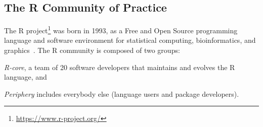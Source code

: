 



\subsection{The R Community of Practice}
    
    The R project\footnote{\url{https://www.r-project.org/}} was born in 1993, as a Free and Open Source programming language and software environment for statistical computing, bioinformatics, and graphics~\cite{Ihaka1996}.
    The R community is composed of two groups:
    \begin{enumerate*}[label=(\arabic*)]
      \item \textit{R-core}, a team of 20 software developers that maintains and evolves the R language, and
      \item \textit{Periphery} includes everybody else (language users and package developers).
    \end{enumerate*}


